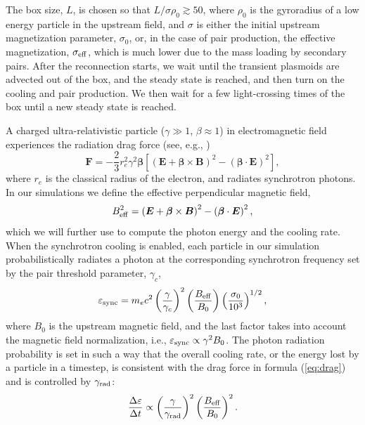 The box size, $L$, is chosen so that $L/\sigma\rho_0 \gtrsim 50$, where $\rho_0$ is the gyroradius of a low energy particle in the upstream field, and $\sigma$ is either the initial upstream magnetization parameter, $\sigma_0$, or, in the case of pair production, the effective magnetization, $\sigma_{\rm eff}$, which is much lower due to the mass loading by secondary pairs. After the reconnection starts, we wait until the transient plasmoids are advected out of the box, and the steady state is reached, and then turn on the cooling and pair production. We then wait for a few light-crossing times of the box until a new steady state is reached.

A charged ultra-relativistic particle ($\gamma\gg 1$, $\beta\approx 1$) in electromagnetic field experiences the radiation drag force (see, e.g., \citealt{1975ctf..book.....L})
\begin{equation}
\label{eq:drag}
    \bm{F} = -\frac{2}{3}r_e^2\gamma^2\bm{\beta}\left[\left(\bm{E}+\bm{\beta}\times\bm{B}\right)^2 - \left(\bm{\beta}\cdot\bm{E}\right)^2\right],
\end{equation}
where $r_e$ is the classical radius of the electron, and radiates synchrotron photons. In our simulations we define the effective perpendicular magnetic field,
\begin{equation}
    B_{\rm eff}^2=\left(\bm{E}+\bm{\beta}\times\bm{B}\right)^2 - \left(\bm{\beta}\cdot\bm{E}\right)^2,
\end{equation}
which we will further use to compute the photon energy and the cooling rate. When the synchrotron cooling is enabled, each particle in our simulation probabilistically radiates a photon at the corresponding synchrotron frequency set by the pair threshold parameter, $\gamma_c$,
\begin{equation}
    \label{eq:synch_form}
    \varepsilon_{\rm sync} = m_e c^2\left(\frac{\gamma}{\gamma_c}\right)^2\left(\frac{B_{\rm eff}}{B_0}\right)\left(\frac{\sigma_0}{10^3}\right)^{1/2},
\end{equation}
where $B_0$ is the upstream magnetic field, and the last factor takes into account the magnetic field normalization, i.e., $\varepsilon_{\rm sync}\propto \gamma^2 B_0$. The photon radiation probability is set in such a way that the overall cooling rate, or the energy lost by a particle in a timestep, is consistent with the drag force in formula (\ref{eq:drag}) and is controlled by $\gamma_{\rm rad}$:
\begin{equation}
    \label{eq:synch_rate}
    \frac{\Delta \varepsilon}{\Delta t} \propto \left(\frac{\gamma}{\gamma_{\rm rad}}\right)^2 \left(\frac{B_{\rm eff}}{B_0}\right)^2.
\end{equation}\par
